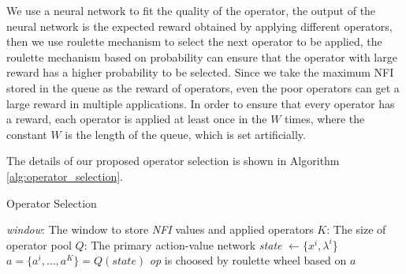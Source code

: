 \documentclass[journal]{IEEEtran}
\begin{document}
We use a neural network to fit the quality of the operator, the output of the neural network is the expected reward obtained by applying different operators, then we use roulette mechanism to select the next operator to be applied, the roulette mechanism based on probability can ensure that the operator with large reward has a higher probability to be selected.
Since we take the maximum NFI stored in the queue as the reward of operators, even the poor operators can get a large reward in multiple applications. In order to ensure that every operator has a reward, each operator is applied at least once in the $W$ times, where the constant $W$ is the length of the queue, which is set artificially.

The details of our proposed operator selection is shown in Algorithm \ref{alg:operator_selection}.

\begin{algorithm}
  \label{alg:operator_selection}
  \caption{Operator Selection}
  \small
  \textit{window}: The window to store \textit{NFI} values and applied operators\;  %
  $K$: The size of operator pool\;
  $Q$: The primary action-value network\;
  \textit{state} $\leftarrow \{x^i, \lambda^i$\}\;
  $a = \{ a^i, \dots , a^K \} = Q(\textit{state})$\;
  \textit{op} is choosed by roulette wheel based on $a$\;
  \;
\end{algorithm}

\end{document}
